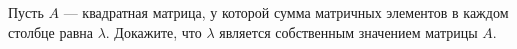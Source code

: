 \documentclass{article}
\begin{document}
Пусть $A$ --- квадратная матрица, у которой сумма матричных элементов в каждом столбце равна $\lambda$. 
Докажите, что $\lambda$ является собственным значением матрицы $A$.
\end{document}
